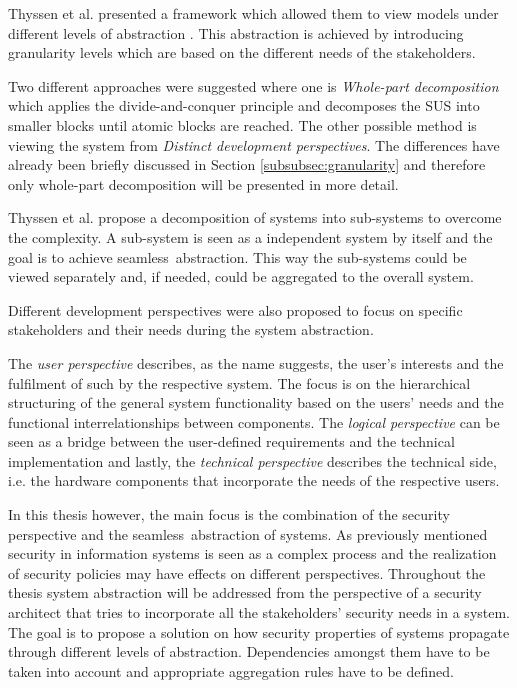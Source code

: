 Thyssen et al. presented a framework which allowed them to view models under different levels of abstraction \cite{thyssen2010system}. This abstraction is achieved by introducing granularity levels which are based on the different needs of the stakeholders. 

Two different approaches were suggested where one is \textit{Whole-part decomposition} which applies the divide-and-conquer principle and decomposes the SUS into smaller blocks until atomic blocks are reached. The other possible method is viewing the system from \textit{Distinct development perspectives}. The differences have already been briefly discussed in Section \ref{subsubsec:granularity} and therefore only whole-part decomposition will be presented in more detail. 

Thyssen et al. propose a decomposition of systems into sub-systems to overcome the complexity. A sub-system is seen as a independent system by itself and the goal is to achieve \glqq seamless\grqq \ abstraction. This way the sub-systems could be viewed separately and, if needed, could be aggregated to the overall system.

Different development perspectives were also proposed to focus on specific stakeholders and their needs during the system abstraction. 

The \textit{user perspective} describes, as the name suggests, the user's interests and the fulfilment of such by the respective system. The focus is on the hierarchical structuring of the general system functionality based on the users' needs and the functional interrelationships between components. The \textit{logical perspective} can be seen as a bridge between the user-defined requirements and the technical implementation and lastly, the \textit{technical perspective} describes the technical side, i.e. the hardware components that incorporate the needs of the respective users.  

In this thesis however, the main focus is the combination of the security perspective and the \glqq seamless\grqq \ abstraction of systems. As previously mentioned security in information systems is seen as a complex process \cite{vacca2012computer} and the realization of security policies may have effects on different perspectives. Throughout the thesis system abstraction will be addressed from the perspective of a security architect that tries to incorporate all the stakeholders' security needs in a system. The goal is to propose a solution on how security properties of systems propagate through different levels of abstraction. Dependencies amongst them have to be taken into account and appropriate aggregation rules have to be defined. 

